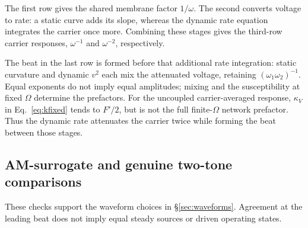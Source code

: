 \documentclass[11pt,a4paper]{article}
\newif\ifjne
\newcommand{\half}{\tfrac{1}{2}}
\begin{document}
The first row gives the shared membrane factor $1/\omega$. The second converts
voltage to rate: a static curve adds its slope, whereas the dynamic rate equation
integrates the carrier once more. Combining these stages gives the third-row
carrier responses, $\omega^{-1}$ and $\omega^{-2}$, respectively.

The beat in the last row is formed before that additional rate integration:
static curvature and dynamic $v^2$ each mix the attenuated voltage, retaining
$(\omega_1\omega_2)^{-1}$. Equal exponents do not imply equal amplitudes; mixing
and the susceptibility at fixed $\Omega$ determine the prefactors. For the
uncoupled carrier-averaged response, $\kappa_V$ in Eq.~\eqref{eq:kfixed} tends to
$F'/2$, but is not the full finite-$\Omega$ network prefactor. Thus the dynamic
rate attenuates the carrier twice while forming the beat between those stages.

\ifjne
\subsection{Harmonic ladder and mixed detectors}\label{supp:harmonics}
Envelope following and square-law detection are distinguishable at a single site. At a matched target,
$\mathcal A(t)=2\varepsilon|\cos(\Omega t/2)|$, whose Fourier series
$|\cos\theta|=\tfrac2\pi+\tfrac4\pi\sum_{n\ge1}\tfrac{(-1)^{n+1}}{4n^2-1}\cos(2n\theta)$ gives a
harmonic ladder whose nonnegative Fourier amplitudes $A_{n\Omega}$ obey $A_{2\Omega}/A_\Omega=1/5$, $A_{3\Omega}/A_\Omega=3/35$ and
$A_{4\Omega}/A_\Omega=1/21$. The square-law output $\half \mathcal A^2=\varepsilon^2(1+\cos\Omega
t)$ contains only DC and $\Omega$. For the mixed family $T(\mathcal A)=c_1\mathcal A+c_2\mathcal A^2$, with
$c_1\ne0$ and a nonzero fundamental, the
pre-network ratio is
\begin{equation}
\mathcal H_{\rm det}\equiv\left|\frac{Y_{2\Omega}}{Y_\Omega}\right|
=\frac{1/5}{\left|1+\tfrac{3\pi}{4}\,c_2\varepsilon/c_1\right|},
\label{eq:rdet}
\end{equation}
so measuring $\mathcal H_{\rm det}$ constrains $c_2\varepsilon/c_1$ within this family.\footnote{The inverse has two branches unless the sign of the fundamental
relative to the linear term is known; for $c_2/c_1\ge0$ it is unique.}

\fi
\subsection{AM-surrogate and genuine two-tone comparisons}\label{supp:waveform-checks}
These checks support the waveform choices in \S\ref{sec:waveforms}. Agreement
at the leading beat does not imply equal steady sources or driven operating states.
\end{document}
